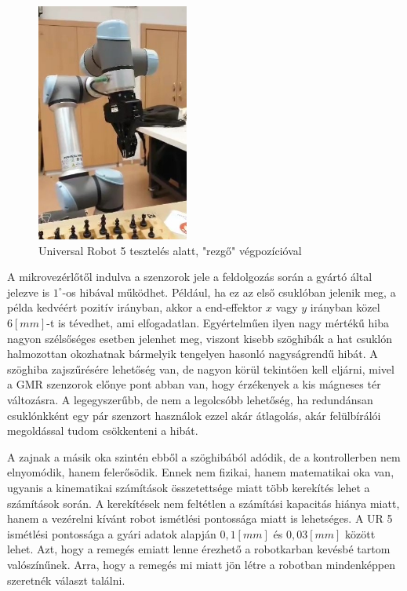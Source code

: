 \begin{figure}[!ht]
\centering
\includegraphics[width=50mm, keepaspectratio]{figures/Robot/Rezgorobot}
\caption{Universal Robot 5 tesztelés alatt, "rezgő" végpozícióval}
\label{fig:valos_robot_rezges}
\end{figure}

A mikrovezérlőtől indulva a szenzorok jele a feldolgozás során a gyártó által jelezve is $1^\circ$-os hibával működhet. Például, ha ez az első csuklóban jelenik meg, a példa kedvéért pozitív irányban, akkor a end-effektor $x$ vagy $y$ irányban közel $6[mm]$-t is tévedhet, ami elfogadatlan. Egyértelműen ilyen nagy mértékű hiba nagyon szélsőséges esetben jelenhet meg, viszont kisebb szöghibák a hat csuklón halmozottan okozhatnak bármelyik tengelyen hasonló nagyságrendű hibát. A szöghiba zajszűrésére lehetőség van, de nagyon körül tekintően kell eljárni, mivel a GMR szenzorok előnye pont abban van, hogy érzékenyek a kis mágneses tér változásra. A legegyszerűbb, de nem a legolcsóbb lehetőség, ha redundánsan csuklónkként egy pár szenzort használok ezzel akár átlagolás, akár felülbírálói megoldással tudom csökkenteni a hibát.

A zajnak a másik oka szintén ebből a szöghibából adódik, de a kontrollerben nem elnyomódik, hanem felerősödik. Ennek nem fizikai, hanem matematikai oka van, ugyanis a kinematikai számítások összetettsége miatt több kerekítés lehet a számítások során. A kerekítések nem feltétlen a számítási kapacitás hiánya miatt, hanem a vezérelni kívánt robot ismétlési pontossága miatt is lehetséges. A UR 5 ismétlési pontossága a gyári adatok alapján $0,1[mm]$ és $0,03[mm]$ között lehet. Azt, hogy a remegés emiatt lenne érezhető a robotkarban kevésbé tartom valószínűnek. Arra, hogy a remegés mi miatt jön létre a robotban mindenképpen szeretnék választ találni.
